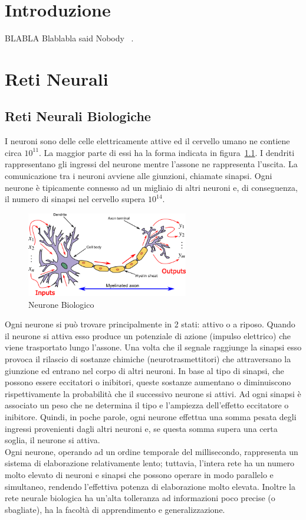 \documentclass[11pt,a4paper,twoside,
openright]{book}
\begin{document}
\tableofcontents

\chapter*{Introduzione}
BLABLA
Blablabla said Nobody ~\cite{Nobody06}.
\chapter{Reti Neurali}
\section{Reti Neurali Biologiche}
I neuroni sono delle celle elettricamente attive ed il cervello umano ne contiene circa $10^{11}$. La maggior parte di essi ha la forma indicata in figura~\ref{fig:neurbio}. I dendriti rappresentano gli ingressi del neurone mentre l’assone ne rappresenta l’uscita. La comunicazione tra i neuroni avviene alle giunzioni, chiamate sinapsi. Ogni neurone è tipicamente connesso ad un migliaio di altri neuroni e, di conseguenza, il numero di sinapsi nel cervello supera $10^{14}$.
\begin{figure}[h!]
\begin{center}
\includegraphics[width=200pt]{BioNeuron.png}
\caption{Neurone Biologico~\cite{pict_neur}}
\end{center}
\label{fig:neurbio}
\end{figure}

Ogni neurone si può trovare principalmente in 2 stati: attivo o a riposo. Quando il neurone si attiva esso produce un potenziale di azione (impulso elettrico) che viene trasportato lungo l’assone. Una volta che il segnale raggiunge la sinapsi esso provoca il rilascio di sostanze chimiche (neurotrasmettitori) che attraversano la giunzione ed entrano nel corpo di altri neuroni. In base al tipo di sinapsi, che possono essere eccitatori o inibitori, queste sostanze aumentano o diminuiscono rispettivamente la probabilità che il successivo neurone si attivi. Ad ogni sinapsi è associato un peso che ne determina il tipo e l’ampiezza dell’effetto eccitatore o inibitore. Quindi, in poche parole, ogni neurone effettua una somma pesata degli ingressi provenienti dagli altri neuroni e, se questa somma supera una certa soglia, il neurone si attiva.\\
Ogni neurone, operando ad un ordine temporale del millisecondo, rappresenta un sistema di elaborazione relativamente lento; tuttavia, l’intera rete ha un numero molto elevato di neuroni e sinapsi che possono operare in modo parallelo e simultaneo, rendendo l’effettiva potenza di elaborazione molto elevata. Inoltre la rete neurale biologica ha un’alta tolleranza ad informazioni poco precise (o sbagliate), ha la facoltà di apprendimento e generalizzazione.
\end{document}
